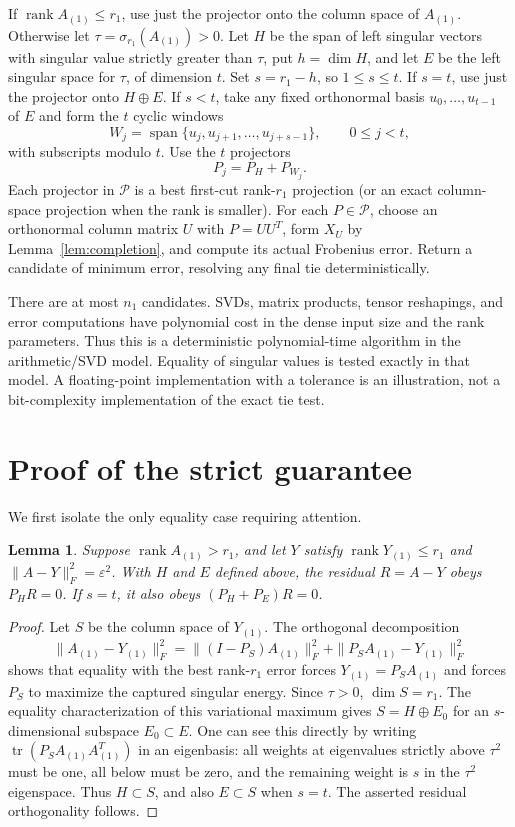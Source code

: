 \documentclass[11pt]{article}
\newtheorem{lemma}[theorem]{Lemma}
\DeclareMathOperator{\rank}{rank}
\begin{document}
If $\rank A_{(1)}\le r_1$, use just the projector onto the column space
of $A_{(1)}$. Otherwise let $\tau=\sigma_{r_1}(A_{(1)})>0$. Let $H$ be
the span of left singular vectors with singular value strictly greater
than $\tau$, put $h=\dim H$, and let $E$ be the left singular space for
$\tau$, of dimension $t$. Set $s=r_1-h$, so $1\le s\le t$.
If $s=t$, use just the projector onto $H\oplus E$.
If $s<t$, take any fixed orthonormal basis $u_0,\ldots,u_{t-1}$ of $E$
and form the $t$ cyclic windows
\[
 W_j=\operatorname{span}\{u_j,u_{j+1},\ldots,u_{j+s-1}\},
 \qquad 0\le j<t,
\]
with subscripts modulo $t$. Use the $t$ projectors
\begin{equation}\label{eq:projectors}
 P_j=P_H+P_{W_j}.
\end{equation}
Each projector in $\mathcal P$ is a best first-cut rank-$r_1$ projection
(or an exact column-space projection when the rank is smaller).
For each $P\in\mathcal P$, choose an orthonormal column matrix $U$ with
$P=UU^T$, form $X_U$ by Lemma~\ref{lem:completion}, and compute its
actual Frobenius error. Return a candidate of minimum error, resolving
any final tie deterministically.

There are at most $n_1$ candidates. SVDs, matrix products, tensor
reshapings, and error computations have polynomial cost in the dense
input size and the rank parameters. Thus this is a deterministic
polynomial-time algorithm in the arithmetic/SVD model. Equality of
singular values is tested exactly in that model. A floating-point
implementation with a tolerance is an illustration, not a bit-complexity
implementation of the exact tie test.

\section{Proof of the strict guarantee}
We first isolate the only equality case requiring attention.

\begin{lemma}\label{lem:matrix}
Suppose $\rank A_{(1)}>r_1$, and let $Y$ satisfy
$\rank Y_{(1)}\le r_1$ and
$\|A-Y\|_F^2=\varepsilon^2$.
With $H$ and $E$ defined above, the residual $R=A-Y$ obeys
$P_HR=0$. If $s=t$, it also obeys $(P_H+P_E)R=0$.
\end{lemma}
\begin{proof}
Let $S$ be the column space of $Y_{(1)}$. The orthogonal decomposition
\[
 \|A_{(1)}-Y_{(1)}\|_F^2
 =\|(I-P_S)A_{(1)}\|_F^2+
   \|P_SA_{(1)}-Y_{(1)}\|_F^2
\]
shows that equality with the best rank-$r_1$ error forces
$Y_{(1)}=P_SA_{(1)}$ and forces $P_S$ to maximize the captured singular
energy. Since $\tau>0$, $\dim S=r_1$. The equality characterization of
this variational maximum gives
$S=H\oplus E_0$ for an $s$-dimensional subspace $E_0\subset E$.
One can see this directly by writing
$\operatorname{tr}(P_SA_{(1)}A_{(1)}^T)$ in an eigenbasis: all weights
at eigenvalues strictly above $\tau^2$ must be one, all below must be
zero, and the remaining weight is $s$ in the $\tau^2$ eigenspace.
Thus $H\subset S$, and also $E\subset S$ when $s=t$.
The asserted residual orthogonality follows.
\end{proof}
\end{document}
